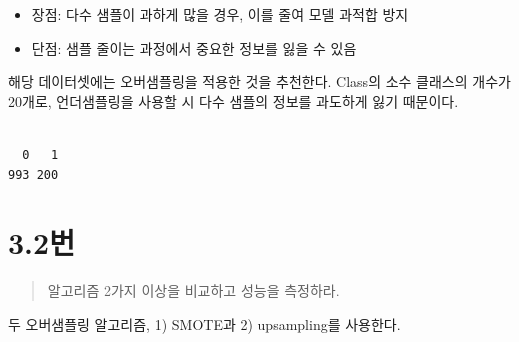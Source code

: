 \documentclass[
  letterpaper,
  DIV=11,
  numbers=noendperiod]{scrreprt}
\newenvironment{Shaded}{\begin{snugshade}}{\end{snugshade}}
\newcommand{\FunctionTok}[1]{\textcolor[rgb]{0.28,0.35,0.67}{#1}}
\newcommand{\NormalTok}[1]{\textcolor[rgb]{0.00,0.23,0.31}{#1}}
\newcommand{\SpecialCharTok}[1]{\textcolor[rgb]{0.37,0.37,0.37}{#1}}
\providecommand{\tightlist}{%
  \setlength{\itemsep}{0pt}\setlength{\parskip}{0pt}}\usepackage{longtable,booktabs,array}
\begin{document}
\begin{itemize}
\tightlist
\item
  장점: 다수 샘플이 과하게 많을 경우, 이를 줄여 모델 과적합 방지
\item
  단점: 샘플 줄이는 과정에서 중요한 정보를 잃을 수 있음
\end{itemize}

해당 데이터셋에는 오버샘플링을 적용한 것을 추천한다. Class의 소수
클래스의 개수가 20개로, 언더샘플링을 사용할 시 다수 샘플의 정보를
과도하게 잃기 때문이다.

\begin{Shaded}
\end{Shaded}

\begin{verbatim}

  0   1 
993 200 
\end{verbatim}

\hypertarget{uxbc88-7}{%
\section*{3.2번}\label{uxbc88-7}}


\begin{quote}
알고리즘 2가지 이상을 비교하고 성능을 측정하라.
\end{quote}

두 오버샘플링 알고리즘, 1) SMOTE과 2) upsampling를 사용한다.
\end{document}
